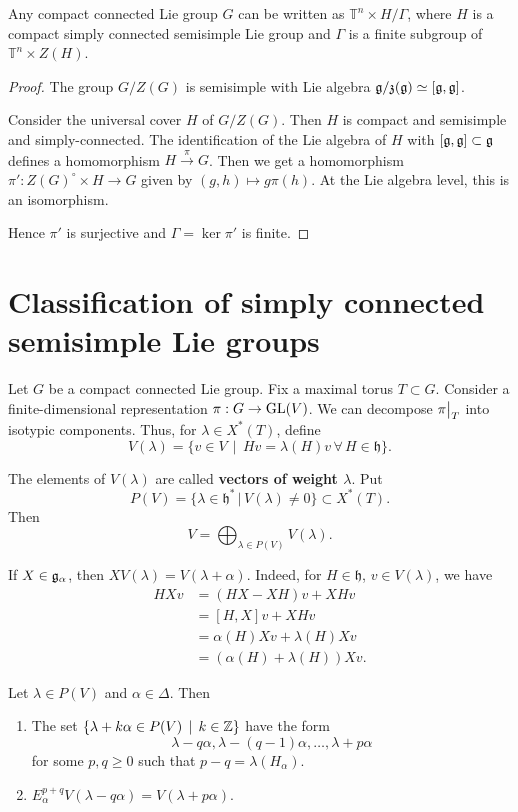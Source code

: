 \documentclass[11pt, english]{article}
\begin{document}
\begin{prop}
 Any compact connected Lie group $G$ can be written as $\mathbb T^n \times H / \Gamma$, where $H$ is a compact simply connected semisimple Lie group and $\Gamma$ is a finite subgroup of $\mathbb T^n \times Z(H)$.
\end{prop}

\begin{proof}
The group $G/Z(G)$ is semisimple with Lie algebra $\mathfrak g/\mathfrak z(\mathfrak g) \simeq [\mathfrak g, \mathfrak g]$. 

Consider the universal cover $H$ of $G/Z(G)$. Then $H$ is compact and semisimple and simply-connected. The identification of the Lie algebra of $H$ with $[\mathfrak g,\mathfrak g] \subset \mathfrak g$ defines a homomorphism $H \xrightarrow{\pi} G$. Then we get a homomorphism $\pi':Z(G)^\circ \times H \to G$ given by $(g,h) \mapsto g \pi(h)$. At the Lie algebra level, this is an isomorphism. 

Hence $\pi'$ is surjective and $\Gamma = \ker \pi'$ is finite.
\end{proof}


\newpage
\section{Classification of simply connected semisimple Lie groups}

Let $G$ be a compact connected Lie group. Fix a maximal torus $T \subset G$. Consider a finite-dimensional representation $\pi:G \to \operatorname{GL}(V)$. We can decompose $\restr{\pi}T$ into isotypic components. Thus, for $\lambda \in X^\ast(T)$, define
$$
V(\lambda) = \{ v \in V \, \mid \, Hv =\lambda(H)v \, \forall \, H \in \mathfrak h \}.
$$

The elements of $V(\lambda)$ are called \textbf{vectors of weight $\lambda$}. Put
$$
P(V) = \{ \lambda \in \mathfrak h^\ast \, | \, V(\lambda) \neq 0 \} \subset X^\ast(T).
$$
Then
$$
V = \bigoplus_{\lambda \in P(V)} V(\lambda).
$$

If $X \in \mathfrak g_\alpha$, then $XV(\lambda) = V(\lambda+\alpha)$. Indeed, for $H \in \mathfrak h$, $v \in V(\lambda)$, we have
\begin{align*}
 HXv &= (HX-XH)v+XHv \\
&= [H,X]v + XHv \\
&= \alpha(H)Xv + \lambda(H)Xv \\
&= (\alpha(H)+\lambda(H))Xv.
\end{align*}
\begin{prop}
 Let $\lambda \in P(V)$ and $\alpha \in \Delta$. Then
 \begin{enumerate}
 \item The set $\{ \lambda + k \alpha \in P(V) \, \mid \, k \in \mathbb{Z} \}$ have the form
$$
\lambda-q\alpha, \lambda-(q-1)\alpha,\ldots, \lambda+p\alpha
$$
for some $p,q \geq 0$ such that $p-q=\lambda(H_\alpha)$. 
\item $E_\alpha^{p+q} V(\lambda-q\alpha) = V(\lambda + p\alpha)$.
 \end{enumerate}
\end{prop}
\end{document}
